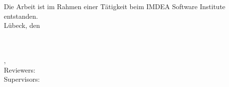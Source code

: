 \begin{titlepage}
      Die Arbeit ist im Rahmen einer Tätigkeit beim IMDEA Software Institute entstanden.\\[10mm]

    Lübeck, den \thesisDate \\

\end{titlepage}


\hfill
\vfill

{
    \small
    \textbf{\thesisName} \\
    \textit{\thesisTitle} \\
    \thesisSubject, \thesisDate \\
    Reviewers: \thesisFirstReviewer \\
    Supervisors: \thesisFirstSupervisor \\[1.5em]%
    \textbf{\thesisUniversity} \\
    \thesisUniversityInstitute \\
    \thesisUniversityStreetAddress \\
    \thesisUniversityPostalCode\ \thesisUniversityCity
}
